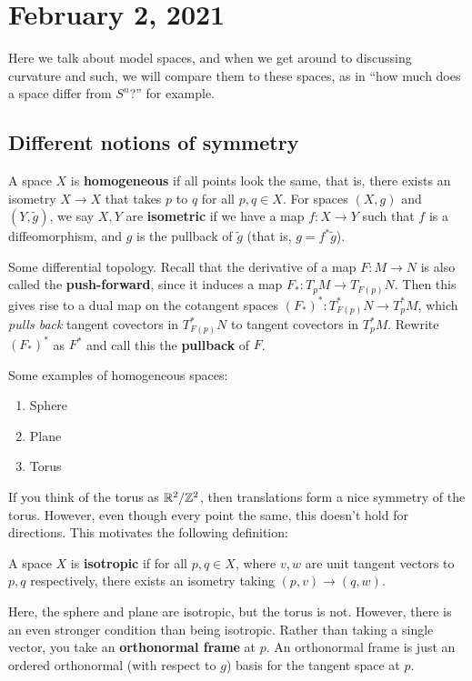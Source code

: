 \section{February 2, 2021}
Here we talk about model spaces, and when we get around to discussing curvature and such, we will compare them to these spaces, as in ``how much does a space differ from $S^n  $?'' for example.

\subsection{Different notions of symmetry}
\begin{definition}[]
    A space $X$ is \textbf{homogeneous} if all points look the same, that is, there exists an isometry $X\to X$ that takes $p$ to $q$ for all $p,q\in X$. For spaces $(X,g)$ and  $(Y,\widetilde g)$, we say $X,Y$ are \textbf{isometric} if we have a map $f \colon X \to Y$ such that $f$ is a diffeomorphism, and $g$ is the pullback of $\widetilde g$ (that is, $g=f^* \widetilde g$).
\end{definition}
\begin{note}
    Some differential topology. Recall that the derivative of a map $F \colon M \to N$ is also called the \textbf{push-forward}, since it induces a map $F_* \colon T_p M \to T_{F(p)}N$. Then this gives rise to a dual map on the cotangent spaces  $(F_*)^* \colon T_{F(p)}^* N \to T_p^* M$, which \emph{pulls back} tangent covectors in $T_{F(p)}^* N$ to tangent covectors in $T_p^* M$. Rewrite $(F_*)^*$ as $F^*$ and call this the \textbf{pullback} of $F$.
\end{note}
\begin{example}
    Some examples of homogeneous spaces:
    \begin{enumerate}
\setlength\itemsep{-.2em}
        \item Sphere
        \item Plane
        \item Torus
    \end{enumerate}
    If you think of the torus as $\mathbb{R}^2 / \mathbb{Z}^2$, then translations form a nice symmetry of the torus. However, even though every point the same, this doesn't hold for directions. This motivates the following definition:
\end{example}

\begin{definition}[]
    A space $X$ is \textbf{isotropic} if for all $p,q \in X$, where $v,w$ are unit tangent vectors to $p,q$ respectively, there exists an isometry taking $(p,v)\to (q,w)$.
\end{definition}
Here, the sphere and plane are isotropic, but the torus is not. However, there is an even stronger condition than being isotropic. Rather than taking a single vector, you take an \textbf{orthonormal frame} at $p$. An orthonormal frame is just an ordered orthonormal (with respect to $g$) basis for the tangent space at $p$.

